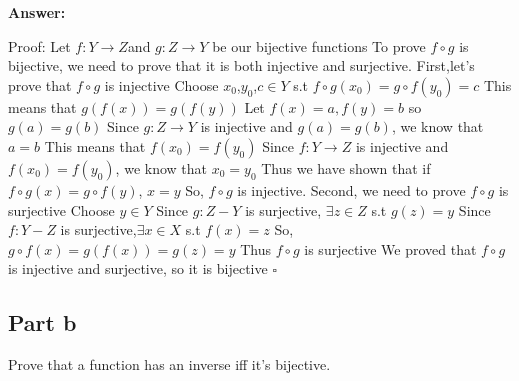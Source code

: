 \documentclass[12pt]{article}
\begin{document}
{\noindent\bf Answer:}
{
Proof: Let $f:Y \rightarrow Z$and $g:Z  \rightarrow Y$ be our bijective functions\newline
To prove $f \circ g$ is bijective, we need to prove that it is both injective and surjective.\newline
First,let's prove that $f\circ g$ is injective\newline
Choose $x_{0}$,$y_{0}$,$c \in Y$  s.t  $f\circ g(x_{0})= g\circ f(y_{0})=c$\newline
This means that $g(f(x))=g(f(y))$\newline
Let $f(x)=a,f(y)=b$ so $g(a)=g(b)$\newline
Since $g: Z  \rightarrow Y$ is injective and $g(a)=g(b)$, we know that $a=b$\newline
This means that $f(x_{0})=f(y_{0})$\newline
Since $f:Y  \rightarrow Z$ is injective and $f(x_{0})=f(y_{0})$, we know that $x_{0}=y_{0}$\newline
Thus we have shown that if $f \circ g(x)= g \circ f(y)$, $x=y$\newline
So, $f\circ g$ is injective.\newline
 \newline
Second, we need to prove $f\circ g$ is surjective\newline
Choose $y  \in Y$ \newline
Since $g: Z-Y$ is surjective, $\exists z \in Z $ s.t $g(z)=y$\newline
Since $f:Y-Z$ is surjective,$\exists x \in X $ s.t $f(x)=z$\newline
So, $ g \circ f(x)= g(f(x))=g(z)=y$\newline
Thus $f\circ g$ is surjective\newline
We proved that  $f\circ g$ is injective and surjective, so it is bijective $\square$\newline
 \newline
 \newline
 \newline

}
\subsection*{Part b}

Prove that a function has an inverse iff it's bijective.\\
\end{document}
